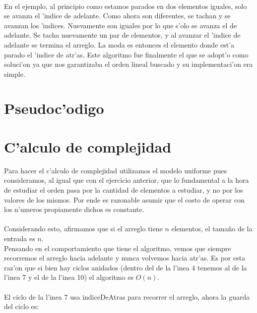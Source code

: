 \paragraph{}
En el ejemplo, al principio como estamos parados en dos elementos iguales, solo se avanza el 'indice de adelante. 
Como ahora son diferentes, se tachan y se avanzan los 'indices. Nuevamente son iguales por lo que s'olo 
se avanza el de adelante. Se tacha nuevamente un par de elementos, y al avanzar el 'indice de adelante se 
termina el arreglo. La moda es entonces el elemento donde est'a parado el 'indice de atr'as.
Este algoritmo fue finalmente el que se adopt'o como soluci'on ya que nos garantizaba el orden lineal 
buscado y su implementaci'on era simple.

\section{Pseudoc'odigo}


\newpage
\section{C'alculo de complejidad}
Para hacer el c'alculo de complejidad utilizamos el modelo uniforme pues consideramos, al igual que con 
el ejercicio anterior, que lo fundamental a la hora de estudiar el orden pasa por la cantidad de elementos 
a estudiar, y no por los valores de los mismos. Por ende es razonable asumir que el costo de operar
con los n'umeros propiamente dichos es constante.\\
\paragraph{}
Considerando esto, afirmamos que si el arreglo tiene $n$ elementos, el tama\~{n}o de la entrada es $n$.\\
Pensando en el comportamiento que tiene el algoritmo, vemos que siempre recorremos el arreglo hacia adelante 
y nunca volvemos hacia atr'as. Es por esta raz'on que si bien hay ciclos anidados (dentro del de la l'inea 
4 tenemos al de la l'inea 7 y el de la l'inea 10) el algoritmo es $O(n)$.
\paragraph{}
El ciclo de la l'inea 7 usa indiceDeAtras para recorrer el arreglo, ahora la guarda del ciclo es:\\

